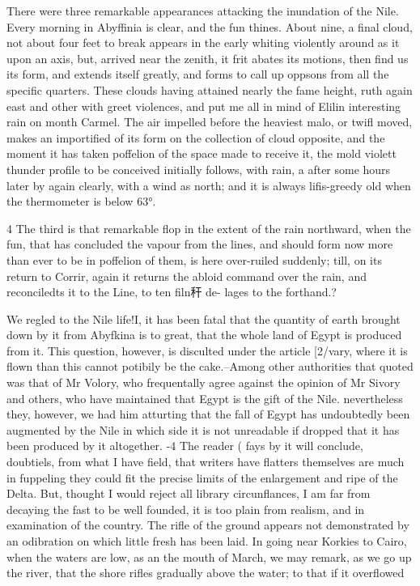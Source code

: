 \documentclass{article}
\begin{document}
There were three remarkable appearances attacking the inundation of the Nile. Every morning in Abyffinia is clear, and the fun thines. About nine, a final cloud, not about four feet to break appears in the early whiting violently around as it upon an axis, but, arrived near the zenith, it frit abates its motions, then find us its form, and extends itself greatly, and forms to call up oppsons from all the specific quarters. These clouds having attained nearly the fame height, ruth again east and other with greet violences, and put me all in mind of Elilin interesting rain on month Carmel. The air impelled before the heaviest malo, or twifl moved, makes an importified of its form on the collection of cloud opposite, and the moment it has taken poffelion of the space made to receive it, the mold violett thunder profile to be conceived initially follows, with rain, a after some hours later by again clearly, with a wind as north; and it is always lifis-greedy old when the thermometer is below 63°.

4 The third is that remarkable flop in the extent of the rain northward, when the fun, that has concluded the vapour from the lines, and should form now more than ever to be in poffelion of them, is here over-ruiled suddenly; till, on its return to Corrir, again it returns the abloid command over the rain, and reconciledts it to the Line, to ten filn秆 de- lages to the forthand.?

We regled to the Nile life!I, it has been fatal that the quantity of earth brought down by it from Abyfkina is to great, that the whole land of Egypt is produced from it. This question, however, is disculted under the article [2/vary, where it is flown than this cannot potibily be the cake.--Among other authorities that quoted was that of Mr Volory, who frequentally agree against the opinion of Mr Sivory and others, who have maintained that Egypt is the gift of the Nile. nevertheless they, however, we had him atturting that the fall of Egypt has undoubtedly been augmented by the Nile in which side it is not unreadable if dropped that it has been produced by it altogether. -4 The reader ( fays by it will conclude, doubtiels, from what I have field, that writers have flatters themselves are much in fuppeling they could fit the precise limits of the enlargement and ripe of the Delta. But, thought I would reject all library circunflances, I am far from decaying the fast to be well founded, it is too plain from realism, and in examination of the country. The rifle of the ground appears not demonstrated by an odibration on which little fresh has been laid. In going near Korkies to Cairo, when the waters are low, as an the mouth of March, we may remark, as we go up the river, that the shore rifles gradually above the water; to that if it overflowed
\end{document}
